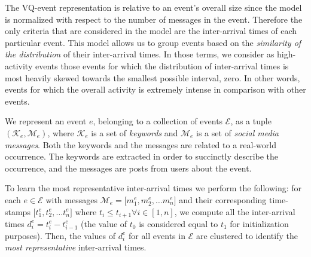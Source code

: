 
The VQ-event representation is relative to an event's overall size since the
model is normalized with respect to the number of messages in the event.
%
Therefore the only criteria that are considered in the model are the
inter-arrival times of each particular event. 
%
This model allows us to group events based on the {\em similarity of the
distribution} of their inter-arrival times. 
%
In those terms, we consider as high-activity events those events for which the
distribution of inter-arrival times is most heavily skewed towards the smallest
possible interval, zero. 
%
In other words, events for which the overall activity is extremely intense in
comparison with other events.


We represent an event $\mathit{e}$, belonging to a collection of events
$\mathcal{E}$, as a tuple $(\mathcal{K}_\mathit{e}, \mathcal{M}_\mathit{e})$,
where $\mathcal{K}_\mathit{e}$ is a set of \emph{keywords} and
$\mathcal{M}_\mathit{e}$ is a set of \emph{social media messages}.
%
Both the keywords and the messages are related to a real-world occurrence. 
%
The keywords are extracted in order to succinctly describe the occurrence, and
the messages are posts from users about the event.


To learn the most representative inter-arrival times we perform the following:
%
for each $\mathit{e} \in \mathcal{E}$ with messages $\mathcal{M}_\mathit{e} =
\lbrack m_{1}^\mathit{e}, m_{2}^\mathit{e}, \ldots m_{n}^\mathit{e} \rbrack$ and
their corresponding time-stamps $\lbrack t_{1}^\mathit{e}, t_{2}^\mathit{e},
\ldots t_{n}^\mathit{e} \rbrack$ where $t_{\mathit{i}} \leq t_{\mathit{i}+1}
\forall \mathit{i} \in [1,n]$, we compute all the inter-arrival times
$d_{\mathit{i}}^\mathit{e} =
t_{\mathit{i}}^\mathit{e}-t_{\mathit{i}-1}^\mathit{e}$ (the value of $t_{0}$ is
considered equal to $t_{1}$ for initialization purposes). 
%
Then, the values of $d_{\mathit{i}}^\mathit{e}$ for all events in $\mathcal{E}$
are clustered to identify the {\em most representative} inter-arrival times.


